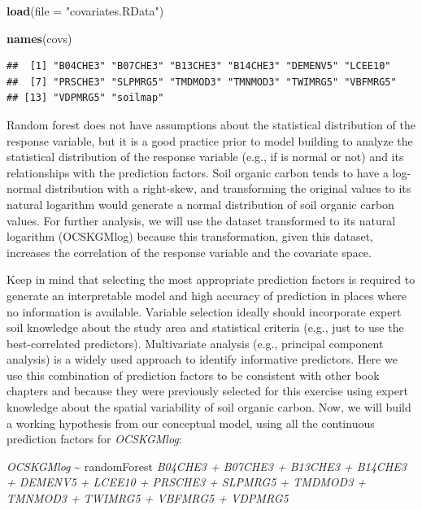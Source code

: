 \documentclass[10pt,b5paper,]{book}
\newenvironment{Shaded}{\begin{snugshade}}{\end{snugshade}}
\newcommand{\DataTypeTok}[1]{\textcolor[rgb]{0.13,0.29,0.53}{#1}}
\newcommand{\KeywordTok}[1]{\textcolor[rgb]{0.13,0.29,0.53}{\textbf{#1}}}
\newcommand{\NormalTok}[1]{#1}
\newcommand{\StringTok}[1]{\textcolor[rgb]{0.31,0.60,0.02}{#1}}
\theoremstyle{definition}
\theoremstyle{definition}
\theoremstyle{definition}
\theoremstyle{remark}
\begin{document}
\begin{Shaded}
\begin{Highlighting}[]
\KeywordTok{load}\NormalTok{(}\DataTypeTok{file =} \StringTok{"covariates.RData"}\NormalTok{)}

\KeywordTok{names}\NormalTok{(covs)}
\end{Highlighting}
\end{Shaded}

\begin{verbatim}
##  [1] "B04CHE3" "B07CHE3" "B13CHE3" "B14CHE3" "DEMENV5" "LCEE10" 
##  [7] "PRSCHE3" "SLPMRG5" "TMDMOD3" "TMNMOD3" "TWIMRG5" "VBFMRG5"
## [13] "VDPMRG5" "soilmap"
\end{verbatim}

Random forest does not have assumptions about the statistical
distribution of the response variable, but it is a good practice prior
to model building to analyze the statistical distribution of the
response variable (e.g., if is normal or not) and its relationships with
the prediction factors. Soil organic carbon tends to have a log-normal
distribution with a right-skew, and transforming the original values to
its natural logarithm would generate a normal distribution of soil
organic carbon values. For further analysis, we will use the dataset
transformed to its natural logarithm (OCSKGMlog) because this
transformation, given this dataset, increases the correlation of the
response variable and the covariate space.

Keep in mind that selecting the most appropriate prediction factors is
required to generate an interpretable model and high accuracy of
prediction in places where no information is available. Variable
selection ideally should incorporate expert soil knowledge about the
study area and statistical criteria (e.g., just to use the
best-correlated predictors). Multivariate analysis (e.g., principal
component analysis) is a widely used approach to identify informative
predictors. Here we use this combination of prediction factors to be
consistent with other book chapters and because they were previously
selected for this exercise using expert knowledge about the spatial
variability of soil organic carbon. Now, we will build a working
hypothesis from our conceptual model, using all the continuous
prediction factors for \emph{OCSKGMlog}:

\emph{OCSKGMlog} \textasciitilde{} randomForest \emph{B04CHE3 + B07CHE3
+ B13CHE3 + B14CHE3 + DEMENV5 + LCEE10 + PRSCHE3 + SLPMRG5 + TMDMOD3 +
TMNMOD3 + TWIMRG5 + VBFMRG5 + VDPMRG5}
\end{document}

